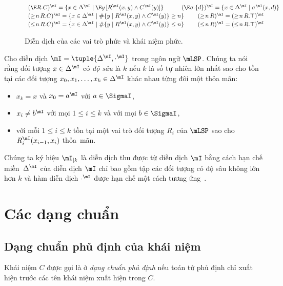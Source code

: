 \begin{figure}
{\[\begin{array}{l}
%
		(\E R.C)^\mI = \{ x \in \Delta^\mI \mid \E y\,[R^\mI(x,y) \wedge C^\mI(y)]\}\qquad\quad (\E \sigma.\{d\})^\mI = \{ x \in \Delta^\mI \mid \sigma^\mI(x,d)\} \\[0.5ex]
%
		(\geq\!n\,R.C)^\mI = \{x \in \Delta^\mI \mid \#\{y \mid R^\mI(x,y) \wedge C^\mI(y)\} \geq n\} \qquad\; (\geq\!n\,R)^\mI = (\geq\!n\,R.\top)^\mI \\[0.5ex]
%
		(\leq\!n\,R.C)^\mI = \{x \in \Delta^\mI \mid \#\{y \mid R^\mI(x,y) \wedge C^\mI(y)\} \leq n \} \qquad\; (\leq\!n\,R)^\mI = (\leq\!n\,R.\top)^\mI
	\end{array}
	\vspace{-2.5ex}
	\]}
\caption{Diễn dịch của các vai trò phức và khái niệm phức.\label{fig:LSPInterpretation}}
\end{figure}

Cho diễn dịch $\mI = \tuple{\Delta^\mI, \cdot^\mI}$ trong ngôn ngữ $\mLSP$. Chúng ta nói rằng đối tượng $x \in \Delta^\mI$ có {\em độ sâu} là $k$ nếu $k$ là số tự nhiên lớn nhất sao cho tồn tại các đối tượng $x_0, x_1, \ldots, x_k \in \Delta^\mI$ khác nhau từng đôi một thỏa mãn:
\begin{itemize}
	\item $x_k = x$ và $x_0 = a^\mI$ với $a \in \SigmaI$,
	\item $x_i \not= b^\mI$ với mọi $1 \leq i \leq k$ và với mọi $b \in \SigmaI$,
	\item với mỗi $1 \leq i \leq k$ tồn tại một vai trò đối tượng $R_i$ của $\mLSP$ sao cho $R_i^\mI(x_{i-1}, x_i)$ thỏa~mãn.
\end{itemize}

Chúng ta ký hiệu $\mI_{\mid k}$ là diễn dịch thu được từ diễn dịch $\mI$ bằng cách hạn chế miền~$\Delta^\mI$ của diễn dịch $\mI$ chỉ bao gồm tập các đối tượng có độ sâu không lớn hơn $k$ và hàm diễn dịch $\cdot^\mI$ được hạn chế một cách tương ứng~\cite{Ha2012}.
\section{Các dạng chuẩn}
\label{sec:Chap1.NormalForms}

\subsection{Dạng chuẩn phủ định của khái niệm}
\label{sec:Chap1.NegationNormalForm}
Khái niệm $C$ được gọi là ở {\em dạng chuẩn phủ định} nếu toán tử phủ định chỉ xuất hiện trước các tên khái niệm xuất hiện trong $C$.

